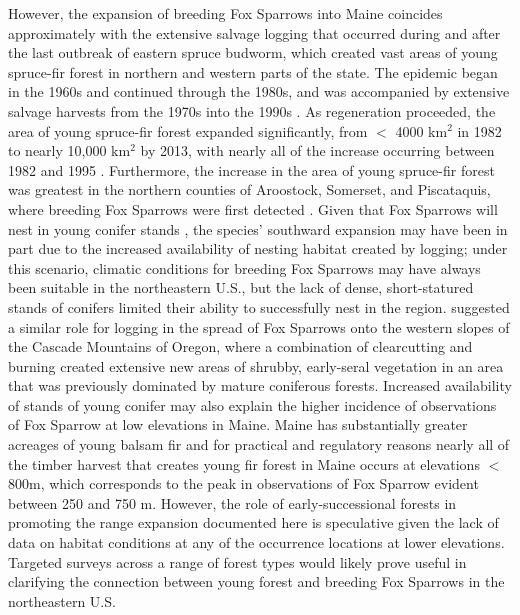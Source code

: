 \documentclass[fleqn,10pt,lineno]{wlpeerj} %
\begin{document}
However, the expansion of breeding Fox Sparrows into Maine coincides approximately with the extensive salvage logging that occurred during and after the last outbreak of eastern spruce budworm, which created vast areas of young spruce-fir forest in northern and western parts of the state. The epidemic began in the 1960s and continued through the 1980s, and was accompanied by extensive salvage harvests from the 1970s into the 1990s \citep{mcwilliams2005forests}. As regeneration proceeded, the area of young spruce-fir forest expanded significantly, from $<$ 4000 km$^2$ in 1982 to nearly 10,000 km$^2$ by 2013, with nearly all of the increase occurring between 1982 and 1995 \citep{mccaskill2016maine}. Furthermore, the increase in the area of young spruce-fir forest was greatest in the northern counties of Aroostock, Somerset, and Piscataquis, where breeding Fox Sparrows were first detected \citep{mcwilliams2005forests}. Given that Fox Sparrows will nest in young conifer stands \citep{Weckstein2002-px}, the species’ southward expansion may have been in part due to the increased availability of nesting habitat created by logging; under this scenario, climatic conditions for breeding Fox Sparrows may have always been suitable in the northeastern U.S., but the lack of dense, short-statured stands of conifers limited their ability to successfully nest in the region. \cite{Banks1970-rh} suggested a similar role for logging in the spread of Fox Sparrows onto the western slopes of the Cascade Mountains of Oregon, where a combination of clearcutting and burning created extensive new areas of shrubby, early-seral vegetation in an area that was previously dominated by mature coniferous forests. Increased availability of stands of young conifer may also explain the higher incidence of observations of Fox Sparrow at low elevations in Maine. Maine has substantially greater acreages of young balsam fir \citep{butler2017forests,morin2017forests} and for practical and regulatory reasons nearly all of the timber harvest that creates young fir forest in Maine occurs at elevations $<$800m, which corresponds to the peak in observations of Fox Sparrow evident between 250 and 750 m. However, the role of early-successional forests in promoting the range expansion documented here is speculative given the lack of data on habitat conditions at any of the occurrence locations at lower elevations. Targeted surveys across a range of forest types would likely prove useful in clarifying the connection between young forest and breeding Fox Sparrows in the northeastern U.S.
\end{document}

